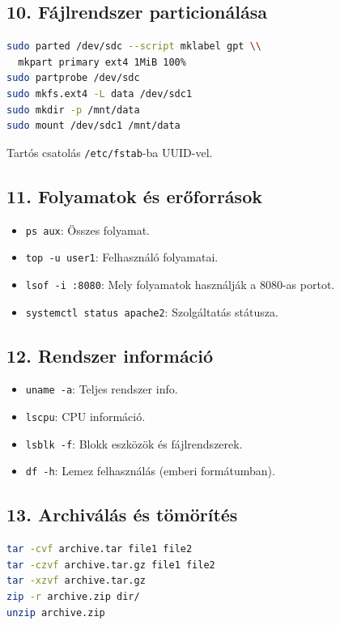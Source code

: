 \documentclass[12pt,a4paper]{article}
\begin{document}
\subsection{10. Fájlrendszer particionálása}

\begin{lstlisting}[language=bash,caption={Partíció létrehozása (/dev/sdc1)}]
sudo parted /dev/sdc --script mklabel gpt \\
  mkpart primary ext4 1MiB 100%
sudo partprobe /dev/sdc
sudo mkfs.ext4 -L data /dev/sdc1
sudo mkdir -p /mnt/data
sudo mount /dev/sdc1 /mnt/data
\end{lstlisting}

Tartós csatolás \texttt{/etc/fstab}-ba UUID-vel.

\subsection{11. Folyamatok és erőforrások}

\begin{itemize}
  \item \texttt{ps aux}: Összes folyamat.
  \item \texttt{top -u user1}: Felhasználó folyamatai.
  \item \texttt{lsof -i :8080}: Mely folyamatok használják a 8080-as portot.
  \item \texttt{systemctl status apache2}: Szolgáltatás státusza.
\end{itemize}

\subsection{12. Rendszer információ}

\begin{itemize}
  \item \texttt{uname -a}: Teljes rendszer info.
  \item \texttt{lscpu}: CPU információ.
  \item \texttt{lsblk -f}: Blokk eszközök és fájlrendszerek.
  \item \texttt{df -h}: Lemez felhasználás (emberi formátumban).
\end{itemize}

\subsection{13. Archiválás és tömörítés}

\begin{lstlisting}[language=bash,caption={TAR és GZIP}]
tar -cvf archive.tar file1 file2
tar -czvf archive.tar.gz file1 file2
tar -xzvf archive.tar.gz
zip -r archive.zip dir/
unzip archive.zip
\end{lstlisting}
\end{document}
